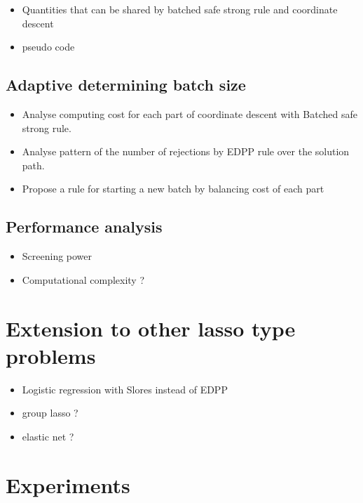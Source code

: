 \documentclass{article}
\begin{document}
\begin{itemize}
    \item Quantities that can be shared by batched safe strong rule and coordinate descent
    \item pseudo code
\end{itemize}

\subsection{Adaptive determining batch size}
\label{sec:batch-size}
\begin{itemize}
    \item Analyse computing cost for each part of coordinate descent with Batched safe strong rule.
    \item Analyse pattern of the number of rejections by EDPP rule over the solution path.
    \item Propose a rule for starting a new batch by balancing cost of each part
\end{itemize}

\subsection{Performance analysis}
\begin{itemize}
    \item Screening power
    \item Computational complexity ?
\end{itemize}

\section{Extension to other lasso type problems}
\label{sec:4}

\begin{itemize}
    \item Logistic regression with Slores instead of EDPP
    \item group lasso ?
    \item elastic net ?
\end{itemize}

\section{Experiments}
\label{sec:5}
\end{document}
